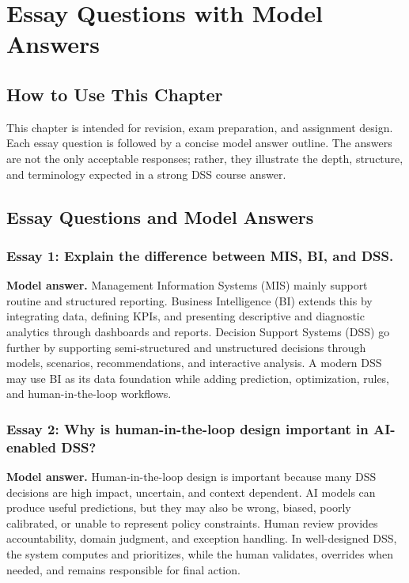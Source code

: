\chapter{Essay Questions with Model Answers}
\label{ch:essay-questions-with-model-answers}

\section{How to Use This Chapter}

This chapter is intended for revision, exam preparation, and assignment design.
Each essay question is followed by a concise model answer outline. The answers
are not the only acceptable responses; rather, they illustrate the depth,
structure, and terminology expected in a strong DSS course answer.

\section{Essay Questions and Model Answers}

\subsection*{Essay 1: Explain the difference between MIS, BI, and DSS.}
\textbf{Model answer.}
Management Information Systems (MIS) mainly support routine and structured
reporting. Business Intelligence (BI) extends this by integrating data,
defining KPIs, and presenting descriptive and diagnostic analytics through
dashboards and reports. Decision Support Systems (DSS) go further by supporting
semi-structured and unstructured decisions through models, scenarios,
recommendations, and interactive analysis. A modern DSS may use BI as its data
foundation while adding prediction, optimization, rules, and human-in-the-loop
workflows.

\subsection*{Essay 2: Why is human-in-the-loop design important in AI-enabled DSS?}
\textbf{Model answer.}
Human-in-the-loop design is important because many DSS decisions are high
impact, uncertain, and context dependent. AI models can produce useful
predictions, but they may also be wrong, biased, poorly calibrated, or unable
to represent policy constraints. Human review provides accountability, domain
judgment, and exception handling. In well-designed DSS, the system computes and
prioritizes, while the human validates, overrides when needed, and remains
responsible for final action.

